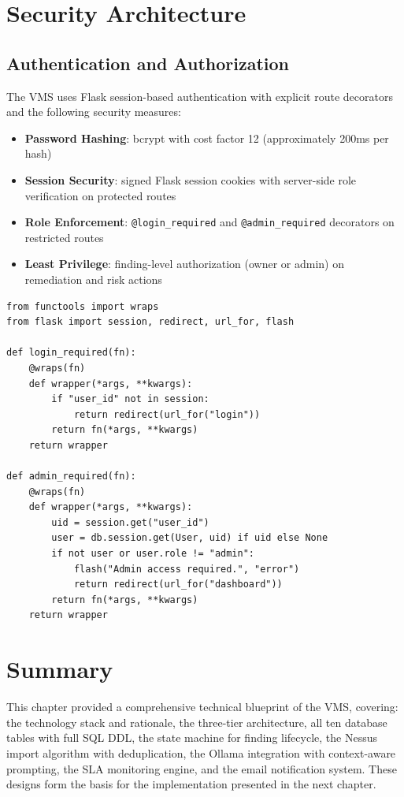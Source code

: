 \section{Security Architecture}

\subsection{Authentication and Authorization}

The VMS uses Flask session-based authentication with explicit route decorators and the following security measures:

\begin{itemize}
  \item \textbf{Password Hashing}: bcrypt with cost factor 12 (approximately 200ms per hash)
  \item \textbf{Session Security}: signed Flask session cookies with server-side role verification on protected routes
  \item \textbf{Role Enforcement}: \texttt{@login\_required} and \texttt{@admin\_required} decorators on restricted routes
  \item \textbf{Least Privilege}: finding-level authorization (owner or admin) on remediation and risk actions
\end{itemize}

\begin{lstlisting}[style=python, caption={Role-Based Access Control Decorator}, label={lst:rbac}]
from functools import wraps
from flask import session, redirect, url_for, flash

def login_required(fn):
    @wraps(fn)
    def wrapper(*args, **kwargs):
        if "user_id" not in session:
            return redirect(url_for("login"))
        return fn(*args, **kwargs)
    return wrapper

def admin_required(fn):
    @wraps(fn)
    def wrapper(*args, **kwargs):
        uid = session.get("user_id")
        user = db.session.get(User, uid) if uid else None
        if not user or user.role != "admin":
            flash("Admin access required.", "error")
            return redirect(url_for("dashboard"))
        return fn(*args, **kwargs)
    return wrapper
\end{lstlisting}

\section{Summary}

This chapter provided a comprehensive technical blueprint of the VMS, covering: the technology stack and rationale, the three-tier architecture, all ten database tables with full SQL DDL, the state machine for finding lifecycle, the Nessus import algorithm with deduplication, the Ollama integration with context-aware prompting, the SLA monitoring engine, and the email notification system. These designs form the basis for the implementation presented in the next chapter.
